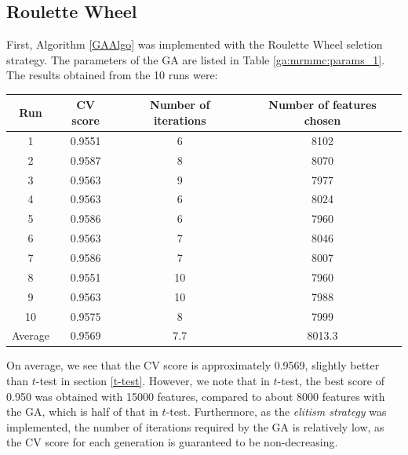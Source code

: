 \documentclass[12pt, twoside, a4paper]{report}
\begin{document}
\subsection{Roulette Wheel}

First, Algorithm \ref{GAAlgo} was implemented with the Roulette Wheel seletion strategy. The parameters of the GA are listed in Table \ref{ga:mrmmc:params_1}.  The results obtained from the 10 runs were:
\begin{center}
    \begin{tabular}{| c | c | c | c | } \hline
    Run & CV score & Number of iterations & Number of features chosen \\ \hline \hline
    1 & 0.9551 & 6 & 8102 \\ \hline
	2 & 0.9587 & 8 & 8070 \\ \hline
	3 & 0.9563 & 9 & 7977 \\ \hline
	4 & 0.9563 & 6 & 8024 \\ \hline
	5 & 0.9586 & 6 & 7960 \\ \hline
	6 & 0.9563 & 7 & 8046 \\ \hline
	7 & 0.9586 & 7 & 8007 \\ \hline
	8 & 0.9551 & 10 & 7960 \\ \hline
	9 & 0.9563 & 10 & 7988 \\ \hline
	10 & 0.9575 & 8 & 7999 \\ \hline
	Average & 0.9569 & 7.7 & 8013.3 \\ \hline
    \end{tabular}
\end{center}

On average, we see that the CV score is approximately 0.9569, slightly better than $t$-test in section \ref{t-test}. However, we note that in $t$-test, the best score of 0.950 was obtained with 15000 features, compared to about 8000 features with the GA, which is half of that in $t$-test. Furthermore, as the \textit{elitism strategy} was implemented, the number of iterations required by the GA is relatively low, as the CV score for each generation is guaranteed to be non-decreasing.
\end{document}
